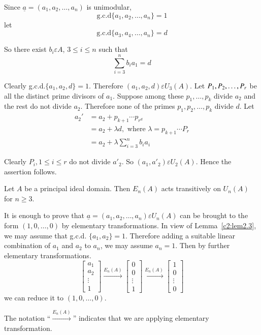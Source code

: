 \begin{Proof}
Since $\underline{a}=(a_1,a_2,\ldots,a_n)$ is unimodular,
$$
\text{g.c.d}\{a_1,a_2,\ldots,a_n\} = 1
$$
let
$$
\text{g.c.d}\{a_3,a_4,\ldots,a_n\} = d
$$

So there exist $b_i\varepsilon A$, $3\leq i\leq n$ such that
$$
\sum\limits_{i=3}^{n}b_ia_1=d
$$

Clearly g.c.d.$\{a_1,a_2,d\} = 1$. Therefore $(a_1,a_2,d)\varepsilon
U_3(A)$. Let $P_1,\\P_2,\ldots,P_r$ be all the distinct prime divisors
of $a_1$. Suppose among these $p_1,\ldots,p_k$ divide $a_2$ and the
rest do not divide $a_2$. Therefore none of the primes
$p_1,p_2,\ldots,p_k$ divide $d$. Let 
\begin{align*}
a_2'&=a_2+p_{k+1}\cdots p_{r^{d}}\\
&=a_2+\lambda d, \text{ where } \lambda=p_{k+1}\cdots P_r\\
&=a_2+\lambda\sum\limits_{i=3}^{n}b_ia_i
\end{align*}

Clearly $P_i, 1\leq i\leq r$ do not divide $a'_2$. So
$(a_1,a'_2)\varepsilon U_2(A)$. Hence the assertion follows.
\enprf
\end{Proof}

\begin{coro}\label{c2:coro2.4}
Let $A$ be a principal ideal domain. Then $E_n(A)$ acts transitively
on $U_n(A)$ for $n\geq 3$.
\end{coro}

\begin{Proof}
It is enough to prove that
$\underline{a}=(a_1,a_2,\ldots,a_n)\varepsilon U_n(A)$ can be brought
to the form $(1,0,\ldots,0)$ by elementary transformations. In view of
Lemma~\ref{c2:lem2.3}, we may assume that
g.c.d. $\{a_1,a_2\}=1$. Therefore adding a suitable linear
combination of $a_1$ and $a_2$ to $a_n$, we may assume $a_n=1$. Then
by further elementary transformations. 
$$
\begin{bmatrix}
a_1\\
a_2\\
\vdots\\
1
\end{bmatrix} \xrightarrow{E_n(A)} \begin{bmatrix}
0\\
0\\
\vdots\\
1
\end{bmatrix} \xrightarrow{E_n(A)} \begin{bmatrix}
1\\
0\\
\vdots\\
0
\end{bmatrix}
$$
we can reduce it to $(1,0,\ldots,0)$.

The notation ``$\xrightarrow{E_n(A)}$'' indicates that we are applying
elementary\\ transformation.
\enprf
\end{Proof}

